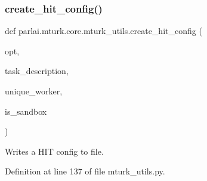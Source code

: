 \mbox{\label{namespaceparlai_1_1mturk_1_1core_1_1mturk__utils_a3f54e0bc76066fc3a784d6b2e3fc13bb}} 
\subsubsection{\texorpdfstring{create\+\_\+hit\+\_\+config()}{create\_hit\_config()}}
{\footnotesize\ttfamily def parlai.\+mturk.\+core.\+mturk\+\_\+utils.\+create\+\_\+hit\+\_\+config (\begin{DoxyParamCaption}\item[{}]{opt,  }\item[{}]{task\+\_\+description,  }\item[{}]{unique\+\_\+worker,  }\item[{}]{is\+\_\+sandbox }\end{DoxyParamCaption})}

\begin{DoxyVerb}Writes a HIT config to file.
\end{DoxyVerb}
 

Definition at line 137 of file mturk\+\_\+utils.\+py.


